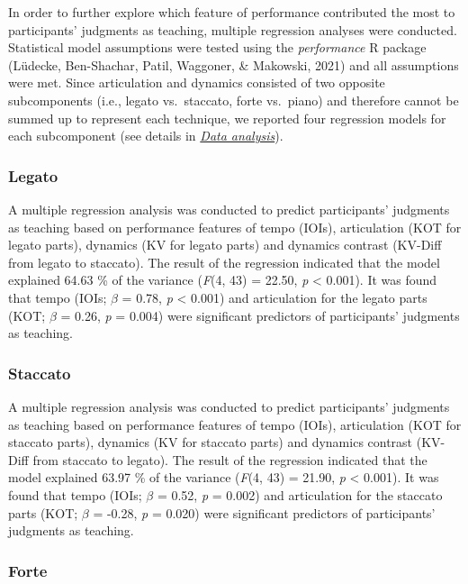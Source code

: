 \documentclass[
  man,floatsintext]{apa6}
\begin{document}
In order to further explore which feature of performance contributed the most to participants' judgments as teaching, multiple regression analyses were conducted. Statistical model assumptions were tested using the \emph{performance} R package (Lüdecke, Ben-Shachar, Patil, Waggoner, \& Makowski, 2021) and all assumptions were met. Since articulation and dynamics consisted of two opposite subcomponents (i.e., legato vs.~staccato, forte vs.~piano) and therefore cannot be summed up to represent each technique, we reported four regression models for each subcomponent (see details in \emph{\protect\hyperlink{dataanalysis}{Data analysis}}).

\hypertarget{legato}{%
\subsubsection{Legato}\label{legato}}

A multiple regression analysis was conducted to predict participants' judgments as teaching based on performance features of tempo (IOIs), articulation (KOT for legato parts), dynamics (KV for legato parts) and dynamics contrast (KV-Diff from legato to staccato). The result of the regression indicated that the model explained 64.63 \% of the variance (\emph{F}(4, 43) = 22.50, \emph{p} \textless{} 0.001). It was found that tempo (IOIs; \emph{\(\beta\)} = 0.78, \emph{p} \textless{} 0.001) and articulation for the legato parts (KOT; \emph{\(\beta\)} = 0.26, \emph{p} = 0.004) were significant predictors of participants' judgments as teaching.

\hypertarget{staccato}{%
\subsubsection{Staccato}\label{staccato}}

A multiple regression analysis was conducted to predict participants' judgments as teaching based on performance features of tempo (IOIs), articulation (KOT for staccato parts), dynamics (KV for staccato parts) and dynamics contrast (KV-Diff from staccato to legato). The result of the regression indicated that the model explained 63.97 \% of the variance (\emph{F}(4, 43) = 21.90, \emph{p} \textless{} 0.001). It was found that tempo (IOIs; \emph{\(\beta\)} = 0.52, \emph{p} = 0.002) and articulation for the staccato parts (KOT; \emph{\(\beta\)} = -0.28, \emph{p} = 0.020) were significant predictors of participants' judgments as teaching.

\hypertarget{forte}{%
\subsubsection{Forte}\label{forte}}
\end{document}
